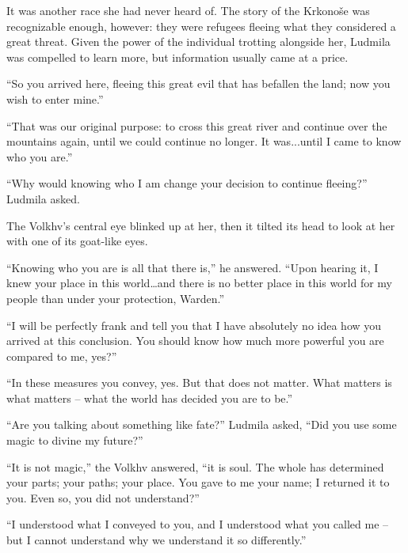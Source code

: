  

It was another race she had never heard of. The story of the Krkonoše was recognizable enough, however: they were refugees fleeing what they considered a great threat. Given the power of the individual trotting alongside her, Ludmila was compelled to learn more, but information usually came at a price.

 

“So you arrived here, fleeing this great evil that has befallen the land; now you wish to enter mine.”

 

“That was our original purpose: to cross this great river and continue over the mountains again, until we could continue no longer. It was...until I came to know who you are.”

 

“Why would knowing who I am change your decision to continue fleeing?” Ludmila asked.

 

The Volkhv’s central eye blinked up at her, then it tilted its head to look at her with one of its goat-like eyes.

 

“Knowing who you are is all that there is,” he answered. “Upon hearing it, I knew your place in this world…and there is no better place in this world for my people than under your protection, Warden.”

 

“I will be perfectly frank and tell you that I have absolutely no idea how you arrived at this conclusion. You should know how much more powerful you are compared to me, yes?”

 

“In these measures you convey, yes. But that does not matter. What matters is what matters – what the world has decided you are to be.”

 

“Are you talking about something like fate?” Ludmila asked, “Did you use some magic to divine my future?”

 

“It is not magic,” the Volkhv answered, “it is soul. The whole has determined your parts; your paths; your place. You gave to me your name; I returned it to you. Even so, you did not understand?”

 

“I understood what I conveyed to you, and I understood what you called me – but I cannot understand why we understand it so differently.”

